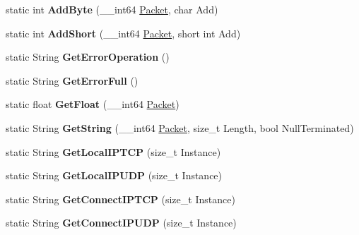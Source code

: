 \begin{DoxyCompactItemize}
\item 
\hypertarget{structmn_c_l_r_a4cb01cb7ccacfdb92a0642f7a0a082ea}{
static int {\bfseries AddByte} (\_\-\_\-int64 \hyperlink{class_packet}{Packet}, char Add)}
\label{structmn_c_l_r_a4cb01cb7ccacfdb92a0642f7a0a082ea}

\item 
\hypertarget{structmn_c_l_r_adc094957639039b733ad2770ca2d4e17}{
static int {\bfseries AddShort} (\_\-\_\-int64 \hyperlink{class_packet}{Packet}, short int Add)}
\label{structmn_c_l_r_adc094957639039b733ad2770ca2d4e17}

\item 
\hypertarget{structmn_c_l_r_ad472d349f2bbf8fbe53e729e881e7fbe}{
static String {\bfseries GetErrorOperation} ()}
\label{structmn_c_l_r_ad472d349f2bbf8fbe53e729e881e7fbe}

\item 
\hypertarget{structmn_c_l_r_a08ce75d44cda507cbbfd6b10d861c73e}{
static String {\bfseries GetErrorFull} ()}
\label{structmn_c_l_r_a08ce75d44cda507cbbfd6b10d861c73e}

\item 
\hypertarget{structmn_c_l_r_ac85b1d0736826aed7fe9eac849e13649}{
static float {\bfseries GetFloat} (\_\-\_\-int64 \hyperlink{class_packet}{Packet})}
\label{structmn_c_l_r_ac85b1d0736826aed7fe9eac849e13649}

\item 
\hypertarget{structmn_c_l_r_a4ed5cc648d58b64ab9db2f950c0b412b}{
static String {\bfseries GetString} (\_\-\_\-int64 \hyperlink{class_packet}{Packet}, size\_\-t Length, bool NullTerminated)}
\label{structmn_c_l_r_a4ed5cc648d58b64ab9db2f950c0b412b}

\item 
\hypertarget{structmn_c_l_r_a1f080e5ec58e07125202bcfc8409e78b}{
static String {\bfseries GetLocalIPTCP} (size\_\-t Instance)}
\label{structmn_c_l_r_a1f080e5ec58e07125202bcfc8409e78b}

\item 
\hypertarget{structmn_c_l_r_ae6d6fc4914875fbf38cc4272458fdc96}{
static String {\bfseries GetLocalIPUDP} (size\_\-t Instance)}
\label{structmn_c_l_r_ae6d6fc4914875fbf38cc4272458fdc96}

\item 
\hypertarget{structmn_c_l_r_ab3e2d2831f67c2cd2f70d5c9c98e5ec5}{
static String {\bfseries GetConnectIPTCP} (size\_\-t Instance)}
\label{structmn_c_l_r_ab3e2d2831f67c2cd2f70d5c9c98e5ec5}

\item 
\hypertarget{structmn_c_l_r_a2398e79a976ba130e687938a5584dc18}{
static String {\bfseries GetConnectIPUDP} (size\_\-t Instance)}
\label{structmn_c_l_r_a2398e79a976ba130e687938a5584dc18}


\end{DoxyCompactItemize}
